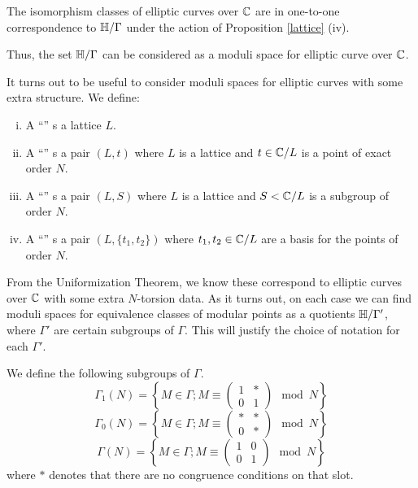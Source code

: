 \documentclass[12pt, a4paper]{amsart}
\begin{document}
\begin{cor}
  The isomorphism classes of elliptic curves over ${\mathbb C}$ are in one-to-one
  correspondence to $\mathbb{H}/\Gamma$ under the action of Proposition
  \autoref{lattice} (iv).
\end{cor}

Thus, the set $\mathbb{H}/\Gamma$ can be considered as a moduli space for elliptic
curve over ${\mathbb C}$. 

\begin{defn}
  It turns out to be useful to consider moduli spaces for elliptic curves with
  some extra structure. We define: 
  \begin{enumerate}[(i)]
  \item A ``'' s a lattice $L$.
  \item A ``'' s a pair $(L,t)$ where $L$ is a
    lattice and $t \in {\mathbb C}/L$ is a point of exact order $N$.
  \item A ``'' s a pair $(L,S)$ where $L$ is a
    lattice and $S < {\mathbb C}/L$ is a subgroup of order $N$.
  \item A ``'' s a pair $(L, \{t_1,t_2\})$ where
    $t_1,t_2 \in {\mathbb C}/L$ are a basis for the points of order $N$.
  \end{enumerate}
\end{defn}

From the Uniformization Theorem, we know these correspond to elliptic curves
over ${\mathbb C}$ with some extra $N$-torsion data.
As it turns out, on each case we can find moduli spaces for equivalence classes of modular
points as a quotients $\mathbb{H} / \Gamma'$, where $\Gamma'$ are certain subgroups of
$\Gamma$. This will justify the choice of notation for each $\Gamma'.$

\begin{defn}
  We define the following subgroups of $\Gamma$.
  \[\Gamma_1(N) = \left\{ 
    M \in \Gamma ; M \equiv
    \left(  
    \begin{array}{ccc}
      1 & * \\ 0 & 1
    \end{array} \right) \mod{N} \right\} 
\]
  \[\Gamma_0(N) = \left\{ 
    M \in \Gamma ; M \equiv
    \left(  
    \begin{array}{ccc}
      * & * \\ 0 & *
    \end{array} \right) \mod{N} \right\} 
\]
  \[\Gamma(N) = \left\{ 
    M \in \Gamma ; M \equiv
    \left(  
    \begin{array}{ccc}
      1 & 0 \\ 0 & 1
    \end{array} \right) \mod{N} \right\} 
\]
where $*$ denotes that there are no congruence conditions on that slot.
\end{defn}
\end{document}
